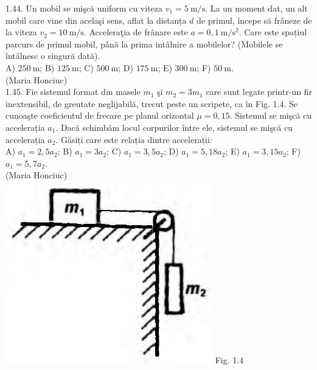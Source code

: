 \documentclass[10pt]{article}
\begin{document}
1.44. Un mobil se mişcă uniform cu viteza $v_{1}=5 \mathrm{~m} / \mathrm{s}$. La un moment dat, un alt mobil care vine din acelaşi sens, aflat la distanța $d$ de primul, începe să frâneze de la viteza $v_{2}=10 \mathrm{~m} / \mathrm{s}$. Acceleraţia de frânare este $a=0,1 \mathrm{~m} / \mathrm{s}^{2}$. Care este spațiul parcurs de primul mobil, până la prima intâlnire a mobilelor? (Mobilele se întâlnesc o singură dată).\\ A) $250 \mathrm{~m}$; B) $125 \mathrm{~m}$; C) $500 \mathrm{~m}$; D) $175 \mathrm{~m}$; E) $300 \mathrm{~m}$; F) $50 \mathrm{~m}$.\\ (Maria Honciuc)\\

1.45. Fie sistemul format din masele $m_{1}$ şi $m_{2}=3 m_{1}$ care sunt legate printr-un fir inextensibil, de greutate neglijabilă, trecut peste un scripete, ca în Fig. 1.4. Se cunoaşte coeficientul de frecare pe planul orizontal $\mu=0,15$. Sistemul se mişcă cu accelerația $a_{1}$. Dacă schimbăm locul corpurilor între ele, sistemul se mişcă cu accelerația $a_{2}$. Găsiți care este relația dintre accelerații:\\ A) $a_{1}=2,5 a_{2}$; B) $a_{1}=3 a_{2}$; C) $a_{1}=3,5 a_{2}$; D) $a_{1}=5,18 a_{2}$; E) $a_{1}=3,15 a_{2}$; F) $a_{1}=5,7 a_{2}$.\\ (Maria Honciuc)\\ \includegraphics[max width=\textwidth, center]{2025_07_01_5b3ff9fa0d508c8e9f17g-012} Fig. 1.4\\
\end{document}
